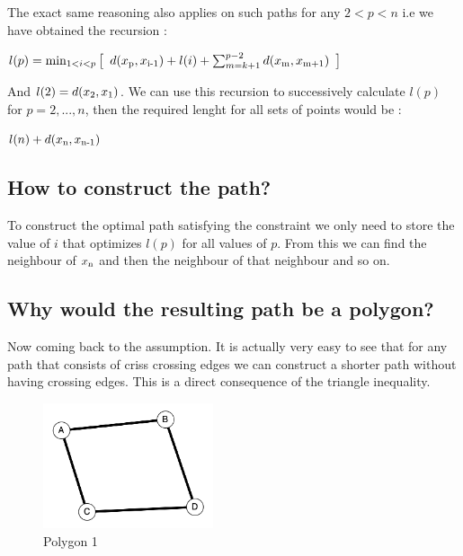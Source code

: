 \documentclass[12pt,letterpaper]{article}
\begin{document}
    The exact same reasoning also applies on such paths for any $2 < p < n$ i.e we have obtained the recursion :

    \begin{center}
        $l(p) = \min_{1<i<p} \big{[}\enspace d(x\textsubscript{p}, x\textsubscript{i-1}) + l(i) + \sum_{m=k+1}^{p-2} d(x\textsubscript{m}, x\textsubscript{m+1})\enspace  \big{]}$
    \end{center}

    And $l(2) = d(x\textsubscript{2}, x\textsubscript{1})$. We can use this recursion to successively calculate $l(p)$ for $p=2,...,n$, then the required lenght for all sets of points would be :

    \begin{center}
        $l(n) + d(x\textsubscript{n}, x\textsubscript{n-1})$
    \end{center}

    \subsection*{How to construct the path?}

        To construct the optimal path satisfying the constraint we only need to store the value of $i$ that optimizes $l(p)$ for all values of $p$. From this we can find the neighbour of $x\textsubscript{n}$ and then the neighbour of that neighbour and so on.

    \subsection*{Why would the resulting path be a polygon?}
        Now coming back to the assumption. It is actually very easy to see that for any path that consists of criss crossing edges we can construct a shorter path without having crossing edges. This is a direct consequence of the triangle inequality.

        \begin{figure}[htp]
            \centering
                \includegraphics[width=5cm]{aPsbRwcprpkjDGQy.png}
                \caption{Polygon 1}
            \label{fig:galaxy}
        \end{figure}
\end{document}
